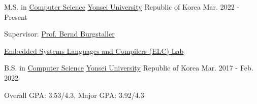 

\begin{cventries}

  \cventry
    {M.S. in \href{https://cs.yonsei.ac.kr/index.php}{Computer Science}} %
    {\href{https://www.yonsei.ac.kr/sc/index.jsp}{Yonsei University}} %
    {Republic of Korea} %
    {Mar. 2022 - Present} %
    {
      \begin{cvitems} %
        \item {Supervisor: \href{https://cs.yonsei.ac.kr/bbs/board.php?bo_table=sub2_1_a&wr_id=18}{Prof. Bernd Burgstaller}}
        \item {\href{https://elc.yonsei.ac.kr}{Embedded Systems Languages and Compilers (ELC) Lab}}
      \end{cvitems}
    }

  \cventry
    {B.S. in \href{https://cs.yonsei.ac.kr/index.php}{Computer Science}} %
    {\href{https://www.yonsei.ac.kr/sc/index.jsp}{Yonsei University}} %
    {Republic of Korea} %
    {Mar. 2017 - Feb. 2022} %
    {
      \begin{cvitems} %
        \item {Overall GPA: 3.53/4.3, Major GPA: 3.92/4.3}
      \end{cvitems}
    }
\end{cventries}
